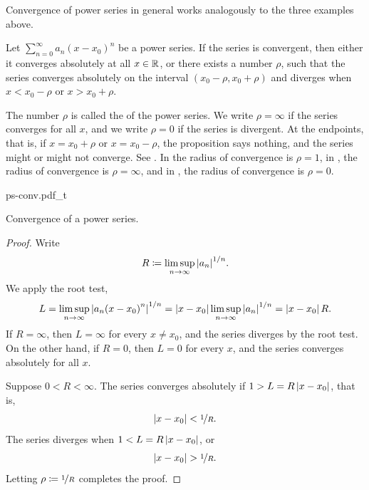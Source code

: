Convergence of power series in general works analogously to
the three examples above.

\begin{prop} \label{prop:powerserrealradius}
Let $\sum_{n=0}^\infty a_n {(x-x_0)}^n$ be a power series.
If the series is convergent, then either it converges absolutely at
all $x \in {\mathbb{R}}$, or
there exists a number $\rho$, such that
the series converges absolutely on the interval
$(x_0-\rho,x_0+\rho)$ and diverges when $x < x_0-\rho$ or $x > x_0+\rho$.
\end{prop}

The number $\rho$ is called the \emph{} of the
power series.  We write $\rho = \infty$ if the series converges for
all $x$, and we write $\rho = 0$ if the series is divergent.
At the endpoints, that is, if $x = x_0+\rho$ or $x = x_0-\rho$,
the proposition says nothing,
and the series might or might not converge.
See .
In 
the radius of convergence is $\rho=1$,
in , the radius of convergence is $\rho=\infty$,
and in , the radius of convergence is $\rho=0$.

\begin{myfigureht}
{ps-conv.pdf_t}
\caption{Convergence of a power series.\label{ps:convfig}}
\end{myfigureht}

\begin{proof}
Write
\begin{equation*}
R \coloneqq \limsup_{n\to\infty} {\left\lvert {a_n} \right\rvert}^{1/n} .
\end{equation*}
We apply the root test,
\begin{equation*}
L = \limsup_{n\to\infty} {\left\lvert {a_n {(x-x_0)}^n} \right\rvert}^{1/n} 
=
\left\lvert {x-x_0} \right\rvert \limsup_{n\to\infty} {\left\lvert {a_n} \right\rvert}^{1/n}
=
\left\lvert {x-x_0} \right\rvert R .
\end{equation*}
If $R = \infty$, then $L=\infty$ for every $x \not= x_0$, and
the series diverges by the root test.
On the other hand,
if $R = 0$, then $L=0$ for every $x$,
and the series converges absolutely for all $x$.

Suppose $0 < R < \infty$.
The series
converges absolutely if
$1 > L = R \left\lvert {x-x_0} \right\rvert$,
that is,
\begin{equation*}
\left\lvert {x-x_0} \right\rvert < \nicefrac{1}{R} .
\end{equation*}
The series diverges when
$1 < L = R \left\lvert {x-x_0} \right\rvert$,
or
\begin{equation*}
\left\lvert {x-x_0} \right\rvert > \nicefrac{1}{R} .
\end{equation*}
Letting $\rho \coloneqq \nicefrac{1}{R}$ completes the proof.
\end{proof}

